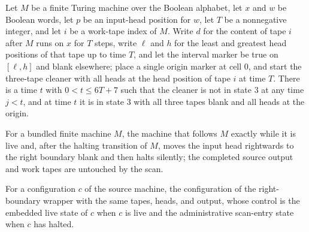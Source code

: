 \begin{lemma}
\label{Turing.FinTM.emCall_clear_first}
\leanok
{}
Let $M$ be a finite Turing machine over the Boolean alphabet, let $x$ and $w$ be Boolean
words, let $p$ be an input-head position for $w$, let $T$ be a nonnegative integer, and
let $i$ be a work-tape index of $M$. Write $d$ for the content of tape $i$ after $M$
runs on $x$ for $T$ steps, write $\ell$ and $h$ for the least and greatest head
positions of that tape up to time $T$, and let the interval marker be true on $[\ell,h]$
and blank elsewhere; place a single origin marker at cell $0$, and start the three-tape
cleaner with all heads at the head position of tape $i$ at time $T$. There is a time $t$
with $0<t\le 6T+7$ such that the cleaner is not in state $3$ at any time $j<t$, and at
time $t$ it is in state $3$ with all three tapes blank and all heads at the origin.
\end{lemma}

\begin{definition}
\label{Turing.FinTM.emCallRightTM}
\leanok
{}
For a bundled finite machine $M$, the machine that follows $M$ exactly while it is live
and, after the halting transition of $M$, moves the input head rightwards to the right
boundary blank and then halts silently; the completed source output and work tapes are
untouched by the scan.
\end{definition}

\begin{definition}
\label{Turing.FinTM.emCallRightCfg}
\leanok
{}
For a configuration $c$ of the source machine, the configuration of the right-boundary
wrapper with the same tapes, heads, and output, whose control is the embedded live state
of $c$ when $c$ is live and the administrative scan-entry state when $c$ has halted.
\end{definition}

